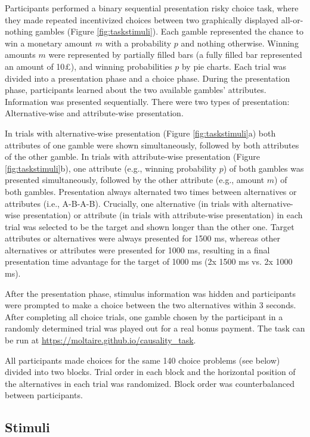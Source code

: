 \documentclass[11pt, a4paper, twocolumn, abstract]{scrartcl}
\begin{document}
Participants performed a binary sequential presentation risky choice task, where they made repeated incentivized choices between two graphically displayed all-or-nothing gambles (Figure \ref{fig:taskstimuli}). Each gamble represented the chance to win a monetary amount $m$ with a probability $p$ and nothing otherwise. Winning amounts $m$ were represented by partially filled bars (a fully filled bar represented an amount of 10\pounds), and winning probabilities $p$ by pie charts. Each trial was divided into a presentation phase and a choice phase. During the presentation phase, participants learned about the two available gambles' attributes. Information was presented sequentially. There were two types of presentation: Alternative-wise and attribute-wise presentation.

In trials with alternative-wise presentation (Figure \ref{fig:taskstimuli}a) both attributes of one gamble were shown simultaneously, followed by both attributes of the other gamble. In trials with attribute-wise presentation (Figure \ref{fig:taskstimuli}b), one attribute (e.g., winning probability $p$) of both gambles was presented simultaneously, followed by the other attribute (e.g., amount $m$) of both gambles. Presentation always alternated two times between alternatives or attributes (i.e., A-B-A-B). Crucially, one alternative (in trials with alternative-wise presentation) or attribute (in trials with attribute-wise presentation) in each trial was selected to be the target and shown longer than the other one. Target attributes or alternatives were always presented for 1500 ms, whereas other alternatives or attributes were presented for 1000 ms, resulting in a final presentation time advantage for the target of 1000 ms (2x 1500 ms vs. 2x 1000 ms).

After the presentation phase, stimulus information was hidden and participants were prompted to make a choice between the two alternatives within 3 seconds.
After completing all choice trials, one gamble chosen by the participant in a randomly determined trial was played out for a real bonus payment.
The task can be run at \url{https://moltaire.github.io/causality_task}.

All participants made choices for the same 140 choice  problems (see below) divided into two blocks. Trial order in each block and the horizontal position of the alternatives in each trial was randomized. Block order was counterbalanced between participants.

\subsection*{Stimuli}
\label{sec:methods:stimuli}
\end{document}
